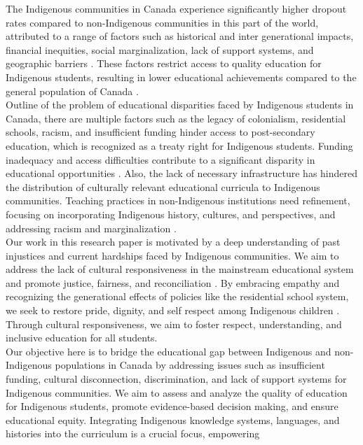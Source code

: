 \documentclass[a4paper,twoside]{article}
\begin{document}
The Indigenous communities in Canada experience significantly higher dropout rates compared to non-Indigenous communities in this part of the world, attributed to a range of factors such as historical and inter generational impacts, financial inequities, social marginalization, lack of support systems, and geographic barriers \cite{GovtOfOntario17}. These factors restrict access to quality education for Indigenous students, resulting in lower educational achievements compared to the general population of Canada \cite{CFSOntario21}.\\Outline of the problem of educational disparities faced by Indigenous students in Canada, there are multiple factors such as the legacy of colonialism, residential schools, racism, and insufficient funding hinder access to post-secondary education, which is recognized as a treaty right for Indigenous students. Funding inadequacy and access difficulties contribute to a significant disparity in educational opportunities \cite{Brown23}. Also, the lack of necessary infrastructure has hindered the distribution of culturally relevant educational curricula to Indigenous communities. Teaching practices in non-Indigenous institutions need refinement, focusing on incorporating Indigenous history, cultures, and perspectives, and addressing racism and
marginalization \cite{GovtOfCanadaEthics19}.\\Our work in this research paper is motivated by a deep understanding of past injustices and current hardships faced by Indigenous communities. We aim to address the lack of cultural responsiveness in the mainstream educational system and promote justice, fairness, and reconciliation \cite{Weston19}. By embracing empathy and recognizing the generational effects of policies like the residential school system, we seek to restore pride, dignity, and self respect among Indigenous children \cite{Kim19}. Through cultural responsiveness, we aim to foster respect, understanding, and inclusive education for all students.\\Our objective here is to bridge the educational gap between Indigenous and non-Indigenous populations in Canada by addressing issues such as insufficient funding, cultural disconnection, discrimination, and lack of support systems for Indigenous communities. We aim to assess and analyze the quality of education for Indigenous students, promote evidence-based decision making, and ensure educational equity. Integrating Indigenous knowledge systems, languages, and histories into the curriculum is a crucial focus, empowering
\end{document}
